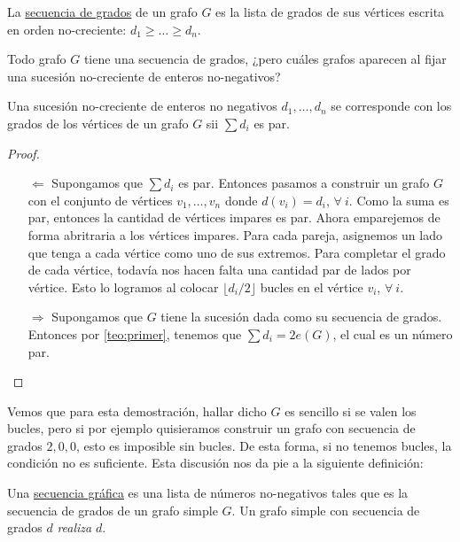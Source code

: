 \begin{defn}
    La \ul{secuencia de grados} de un grafo $G$ es la lista de grados de sus vértices escrita en orden no-creciente: $d_1 \geq \dots \geq d_n$.
\end{defn}

Todo grafo $G$ tiene una secuencia de grados, ¿pero cuáles grafos aparecen al fijar una sucesión no-creciente de enteros no-negativos?

\begin{pro}
    Una sucesión no-creciente de enteros no negativos $d_1, \dots, d_n$ se corresponde con los grados de los vértices de un grafo $G$ sii $\sum d_i$ es par.
\end{pro}

\begin{proof}
    \begin{enumerate}
        \item[$\Leftarrow$] Supongamos que $\sum d_i$ es par. Entonces pasamos a construir un grafo $G$ con el conjunto de vértices $v_1, \dots, v_n$ donde $d(v_i) = d_i$, $\forall~i$. Como la suma es par, entonces la cantidad de vértices impares es par. Ahora emparejemos de forma abritraria a los vértices impares. Para cada pareja, asignemos un lado que tenga a cada vértice como uno de sus extremos. Para completar el grado de cada vértice, todavía nos hacen falta una cantidad par de lados por vértice. Esto lo logramos al colocar $\lfloor d_i/2 \rfloor$ bucles en el vértice $v_i$, $\forall~i$.
        
        \item[$\Rightarrow$] Supongamos que $G$ tiene la sucesión dada como su secuencia de grados. Entonces por \ref{teo:primer}, tenemos que $\sum d_i = 2e(G)$, el cual es un número par.
    \end{enumerate}
\end{proof}

Vemos que para esta demostración, hallar dicho $G$ es sencillo si se valen los bucles, pero si por ejemplo quisieramos construir un grafo con secuencia de grados $2, 0, 0$, esto es imposible sin bucles. De esta forma, si no tenemos bucles, la condición no es suficiente. Esta discusión nos da pie a la siguiente definición:

\begin{defn}
    Una \ul{secuencia gráfica} es una lista de números no-negativos tales que es la secuencia de grados de un grafo simple $G$. Un grafo simple con secuencia de grados $d$ \textit{realiza} $d$.
\end{defn}

